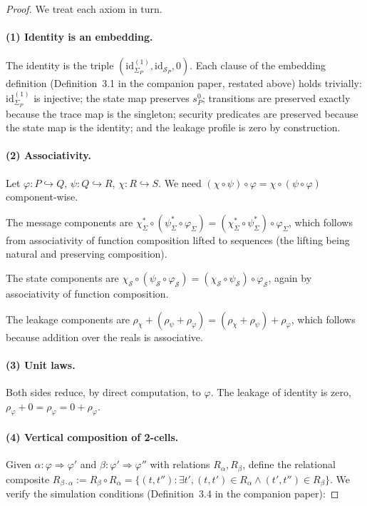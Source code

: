 \documentclass[11pt]{article}
\theoremstyle{definition}
\theoremstyle{remark}
\begin{document}
\begin{proof}
We treat each axiom in turn.

\paragraph{(1) Identity is an embedding.}
The identity is the triple $(\mathrm{id}_{\Sigma_P}^{(1)},
\mathrm{id}_{\mathcal{S}_P}, 0)$. Each clause of the embedding
definition (Definition~3.1 in the companion paper, restated above) holds
trivially: $\mathrm{id}_{\Sigma_P}^{(1)}$ is injective; the state map
preserves $s^0_P$; transitions are preserved exactly because the
trace map is the singleton; security predicates are preserved
because the state map is the identity; and the leakage profile is
zero by construction.

\paragraph{(2) Associativity.}
Let $\varphi : P \hookrightarrow Q$, $\psi : Q \hookrightarrow R$,
$\chi : R \hookrightarrow S$. We need
$(\chi \circ \psi) \circ \varphi = \chi \circ (\psi \circ \varphi)$
component-wise.

The message components are
$\chi_\Sigma^* \circ (\psi_\Sigma^* \circ \varphi_\Sigma)
= (\chi_\Sigma^* \circ \psi_\Sigma^*) \circ \varphi_\Sigma$, which
follows from associativity of function composition lifted to
sequences (the lifting being natural and preserving composition).

The state components are $\chi_\mathcal{S} \circ (\psi_\mathcal{S}
\circ \varphi_\mathcal{S}) = (\chi_\mathcal{S} \circ
\psi_\mathcal{S}) \circ \varphi_\mathcal{S}$, again by associativity
of function composition.

The leakage components are $\rho_\chi + (\rho_\psi + \rho_\varphi)
= (\rho_\chi + \rho_\psi) + \rho_\varphi$, which follows because
addition over the reals is associative.

\paragraph{(3) Unit laws.}
Both sides reduce, by direct computation, to $\varphi$. The leakage
of identity is zero, $\rho_\varphi + 0 = \rho_\varphi = 0 +
\rho_\varphi$.

\paragraph{(4) Vertical composition of 2-cells.}
Given $\alpha : \varphi \Rightarrow \varphi'$ and $\beta : \varphi'
\Rightarrow \varphi''$ with relations $R_\alpha, R_\beta$, define
the relational composite $R_{\beta \cdot \alpha} := R_\beta \circ
R_\alpha = \{(t, t'') : \exists t', (t, t') \in R_\alpha \wedge
(t', t'') \in R_\beta\}$. We verify the simulation conditions
(Definition~3.4 in the companion paper):


\end{proof}
\end{document}
